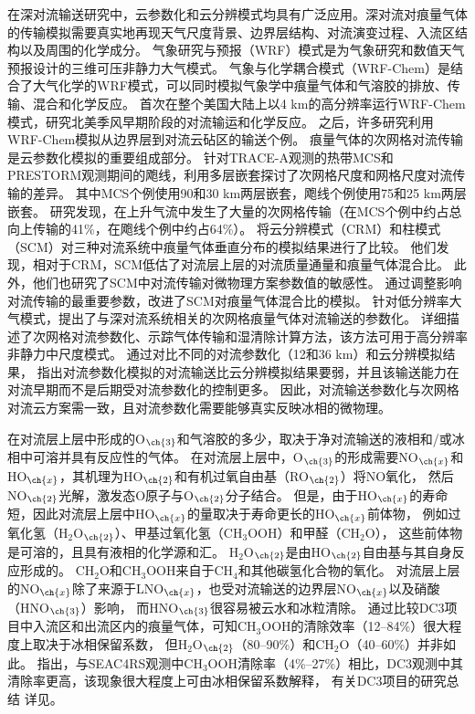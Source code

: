 在深对流输送研究中，云参数化和云分辨模式均具有广泛应用。深对流对痕量气体的传输模拟需要真实地再现天气尺度背景、边界层结构、对流演变过程、入流区结构以及周围的化学成分。 气象研究与预报（WRF）模式是为气象研究和数值天气预报设计的三维可压非静力大气模式。
气象与化学耦合模式（WRF-Chem）是结合了大气化学的WRF模式，可以同时模拟气象学中痕量气体和气溶胶的排放、传输、混合和化学反应\citep{Fast.2006,Grell.2005}。
\citet{Barth.2012}首次在整个美国大陆上以4 km的高分辨率运行WRF-Chem模式，研究北美季风早期阶段的对流输运和化学反应。
之后，许多研究利用WRF-Chem模拟从边界层到对流云砧区的输送个例\citep{Bela.2016,Li.2017b,Li.2018}。
痕量气体的次网格对流传输是云参数化模拟的重要组成部分。
\citet{Wang.1996}针对TRACE-A观测的热带MCS和PRESTORM观测期间的飑线，利用多层嵌套探讨了次网格尺度和网格尺度对流传输的差异。
其中MCS个例使用90和30 km两层嵌套，飑线个例使用75和25 km两层嵌套。
研究发现，在上升气流中发生了大量的次网格传输（在MCS个例中约占总向上传输的41\%，在飑线个例中约占64\%）。
\citet{Ott.2009}将云分辨模式（CRM）和柱模式（SCM）对三种对流系统中痕量气体垂直分布的模拟结果进行了比较。
他们发现，相对于CRM，SCM低估了对流层上层的对流质量通量和痕量气体混合比。
此外，他们也研究了SCM中对流传输对微物理方案参数值的敏感性。
通过调整影响对流传输的最重要参数，改进了SCM对痕量气体混合比的模拟。
\citet{Freitas.2000}针对低分辨率大气模式，提出了与深对流系统相关的次网格痕量气体对流输送的参数化。
\citet{Grell.2014}详细描述了次网格对流参数化、示踪气体传输和湿清除计算方法，该方法可用于高分辨率非静力中尺度模式。
\citet{Li.2018}通过对比不同的对流参数化（12和36 km）和云分辨模拟结果，
指出对流参数化模拟的对流输送比云分辨模拟结果要弱，并且该输送能力在对流早期而不是后期受对流参数化的控制更多。
因此，对流输送参数化与次网格对流云方案需一致，且对流参数化需要能够真实反映冰相的微物理。

在对流层上层中形成的O$_{\ch{3}}$和气溶胶的多少，取决于净对流输送的液相和/或冰相中可溶并具有反应性的气体。
在对流层上层中，O$_{\ch{3}}$的形成需要NO$_{\ch{x}}$和HO$_{\ch{x}}$，其机理为HO$_{\ch{2}}$和有机过氧自由基（RO$_{\ch{2}}$）将NO氧化，
然后NO$_{\ch{2}}$光解，激发态O原子与O$_{\ch{2}}$分子结合。
但是，由于HO$_{\ch{x}}$的寿命短，因此对流层上层中HO$_{\ch{x}}$的量取决于寿命更长的HO$_{\ch{x}}$前体物\citep{Chatfield.1984,Prather.1997}，
例如过氧化氢（H$_2$O$_{\ch{2}}$）、甲基过氧化氢（CH$_3$OOH）和甲醛（CH$_2$O），
这些前体物是可溶的，且具有液相的化学源和汇\citep{Barth.2007,Carlton.2007}。
H$_2$O$_{\ch{2}}$是由HO$_{\ch{2}}$自由基与其自身反应形成的。 CH$_2$O和CH$_3$OOH来自于CH$_4$和其他碳氢化合物的氧化。
对流层上层的NO$_{\ch{x}}$除了来源于LNO$_{\ch{x}}$，也受对流输送的边界层NO$_{\ch{x}}$以及硝酸（HNO$_{\ch{3}}$）影响\citep{Grassian.2005}，
而HNO$_{\ch{3}}$很容易被云水和冰粒清除\citep{Neu.2012}。
通过比较DC3项目中入流区和出流区内的痕量气体，可知CH$_3$OOH的清除效率（12--84\%）很大程度上取决于冰相保留系数，
但H$_2$O$_{\ch{2}}$（80--90\%）和CH$_2$O（40--60\%）并非如此\citep{Barth.2016,Bela.2016,Fried.2016}。
\citet{Cuchiara.2020}指出，与SEAC4RS观测中CH$_3$OOH清除率（4\%--27\%）相比，DC3观测中其清除率更高，该现象很大程度上可由冰相保留系数解释，
有关DC3项目的研究总结
详见\citet{Barth.2019}。

